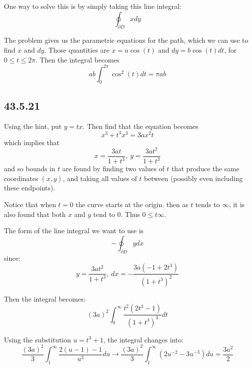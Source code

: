 \documentclass{article}
\begin{document}
One way to solve this is by simply taking this line integral:
$$\oint_{\partial D}xdy$$

The problem gives us the parametric equations for the path, which we can use to find $x$ and $dy$. Those quantities are $x=a\cos(t)$ and $dy = b\cos(t)dt$, for $0\leq t \leq 2\pi$. Then the integral becomes $$ab\int_0^{2\pi} \cos^2(t)dt = \pi ab$$

\subsection{43.5.21}

Using the hint, put $y=tx$. Then find that the equation becomes $$x^3+t^3x^3 = 3ax^2t$$ which implies that $$x=\frac{3at}{1+t^3},~ y=\frac{3at^2}{1+t^3}$$ and so bounds in $t$ are found by finding two values of $t$ that produce the same coordinates $(x,y)$, and taking all values of $t$ between (possibly even including these endpoints).

Notice that when $t=0$ the curve starts at the origin. then as $t$ tends to $\infty$, it is also found that both $x$ and $y$ tend to $0$. Thus $0\leq t \infty$.

The form of the line integral we want to use is $$-\oint_{\partial D} ydx$$ since:$$y=\frac{3at^2}{1+t^3},~ dx=-\frac{3 a (-1 + 2 t^3)}{(1 + t^3)^2} $$

Then the integral becomes:
$$(3a)^2\int_0^{\infty}\frac{t^2(2t^3-1)}{(1+t^3)^3}dt$$

Using the substitution $u=t^3+1$, the integral changes into:
$$\frac{(3a)^2}{3}\int_1^{\infty}\frac{2(u-1)-1}{u^3}du \to \frac{(3a)^2}{3}\int_1^{\infty}\left(2u^{-2}-3u^{-3}\right)du = \frac{3a^2}{2}$$
\end{document}
